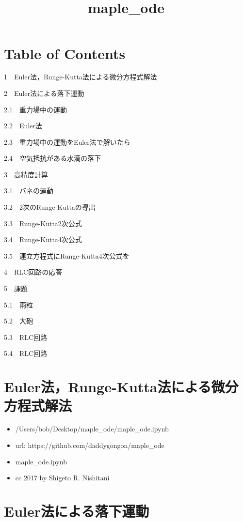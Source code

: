 \documentclass[11pt,dvipdfmx]{jsarticle}
\title{maple\_ode}
\providecommand{\tightlist}{%
      \setlength{\itemsep}{0pt}\setlength{\parskip}{0pt}}
\begin{document}
    
    
    \maketitle
    
    

    
    \section{Table of Contents}\label{table-of-contents}

{1~~}Euler法，Runge-Kutta法による微分方程式解法

{2~~}Euler法による落下運動

{2.1~~}重力場中の運動

{2.2~~}Euler法

{2.3~~}重力場中の運動をEuler法で解いたら

{2.4~~}空気抵抗がある水滴の落下

{3~~}高精度計算

{3.1~~}バネの運動

{3.2~~}2次のRunge-Kuttaの導出

{3.3~~}Runge-Kutta2次公式

{3.4~~}Runge-Kutta4次公式

{3.5~~}連立方程式にRunge-Kutta4次公式を

{4~~}RLC回路の応答

{5~~}課題

{5.1~~}雨粒

{5.2~~}大砲

{5.3~~}RLC回路

{5.4~~}RLC回路

    \section{Euler法，Runge-Kutta法による微分方程式解法}\label{eulerux6cd5runge-kuttaux6cd5ux306bux3088ux308bux5faeux5206ux65b9ux7a0bux5f0fux89e3ux6cd5}

\begin{itemize}
\tightlist
\item
  /Users/bob/Desktop/maple\_ode/maple\_ode.ipynb
\item
  url: https://github.com/daddygongon/maple\_ode
\item
  maple\_ode.ipynb
\item
  cc 2017 by Shigeto R. Nishitani
\end{itemize}

    \section{Euler法による落下運動}\label{eulerux6cd5ux306bux3088ux308bux843dux4e0bux904bux52d5}
\end{document}
